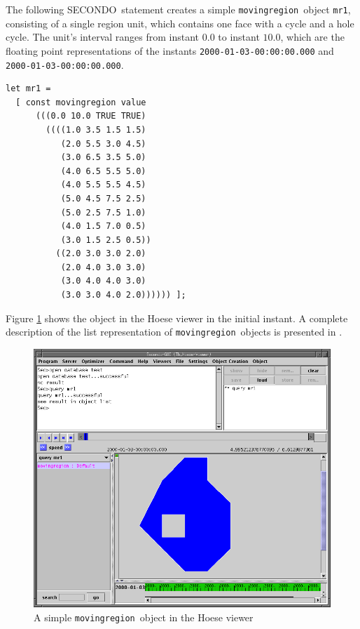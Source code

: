 \documentclass[a4paper,12pt]{article}
\newcommand{\secondo}{{\scshape SE\-CON\-DO}}
\newcommand{\mr}{{\tt movingregion}}
\begin{document}
The following \secondo\ statement creates a simple \mr\ object {\tt mr1},
consisting
of a single region unit, which contains one face with a cycle and a hole
cycle. The unit's interval ranges from instant $0.0$ to instant $10.0$,
which are the
floating point representations of the instants {\tt 2000-01-03-00:00:00.000}
and {\tt 2000-01-03-00:00:00.000}.
\begin{verbatim}
let mr1 = 
  [ const movingregion value 
      (((0.0 10.0 TRUE TRUE)
        ((((1.0 3.5 1.5 1.5)
           (2.0 5.5 3.0 4.5)
           (3.0 6.5 3.5 5.0)
           (4.0 6.5 5.5 5.0)
           (4.0 5.5 5.5 4.5)
           (5.0 4.5 7.5 2.5)
           (5.0 2.5 7.5 1.0)
           (4.0 1.5 7.0 0.5)
           (3.0 1.5 2.5 0.5))
          ((2.0 3.0 3.0 2.0)
           (2.0 4.0 3.0 3.0)
           (3.0 4.0 4.0 3.0)
           (3.0 3.0 4.0 2.0)))))) ];
\end{verbatim}
Figure
\ref{creating:simple1} shows the object in the Hoese viewer in the initial
instant. A complete description of the list representation of \mr\ objects is
presented in \cite{LeB04}.
\begin{figure}
  \begin{center}
    \includegraphics[scale=0.4]{screenshot01.png}
  \end{center}
  \caption{A simple \mr\ object in the Hoese viewer}
  \label{creating:simple1}
\end{figure}
\end{document}
